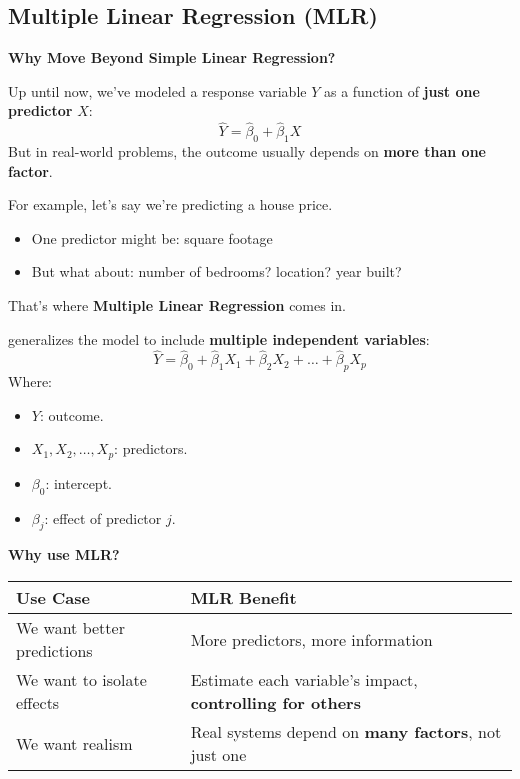 \subsection{Multiple Linear Regression (MLR)}

\begin{flushleft}
    \textcolor{Green3}{ \textbf{Why Move Beyond Simple Linear Regression?}}
\end{flushleft}
Up until now, we've modeled a response variable $Y$ as a function of \textbf{just one predictor} $X$:
\begin{equation*}
    \hat{Y} = \hat{\beta}_0 + \hat{\beta}_1 X
\end{equation*}
But in real-world problems, the outcome usually depends on \textbf{more than one factor}.

\highspace
For example, let's say we're predicting a house price.
\begin{itemize}
    \item One predictor might be: square footage
    \item But what about: number of bedrooms? location? year built?
\end{itemize}
That's where \textbf{Multiple Linear Regression} comes in.

\highspace
{} generalizes the model to include \textbf{multiple independent variables}:
\begin{equation}
    \hat{Y} = \hat{\beta}_0 + \hat{\beta}_1 X_1 + \hat{\beta}_2 X_2 + \dots + \hat{\beta}_p X_p
\end{equation}
Where:
\begin{itemize}
    \item $Y$: outcome.
    \item $X_1, X_2, \dots, X_p$: predictors.
    \item $\beta_0$: intercept.
    \item $\beta_j$: effect of predictor $j$.
\end{itemize}

\highspace
\begin{flushleft}
    \textcolor{Green3}{ \textbf{Why use MLR?}}
\end{flushleft}
\begin{table}[!htp]
    \centering
    \begin{adjustbox}{width={\textwidth},totalheight={\textheight},keepaspectratio}
        \begin{tabular}{@{} l | l @{}}
            \toprule
            Use Case & MLR Benefit \\
            \midrule
            We want better predictions & More predictors, more information \\ [.5em]
            We want to isolate effects & Estimate each variable's impact, \textbf{controlling for others} \\ [.5em]
            We want realism & Real systems depend on \textbf{many factors}, not just one \\
            \bottomrule
        \end{tabular}
    \end{adjustbox}
\end{table}


